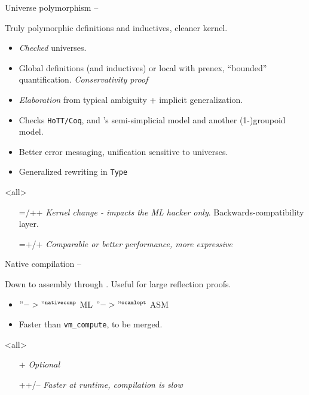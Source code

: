 
\begin{subsecframe}{Universe polymorphism -- }
  \begin{center}
    Truly polymorphic definitions and inductives, cleaner kernel. 
  \end{center}
  
  \begin{itemize}
  \item \emph{Checked} universes.
  \item Global definitions (and inductives) or local with prenex, ``bounded''
    quantification. \emph{Conservativity proof}
  \item \emph{Elaboration} from typical ambiguity + implicit
    generalization.
  \item Checks \texttt{HoTT/Coq},  and 's semi-simplicial
    model and another (1-)groupoid model.
  \item Better error messaging, unification sensitive to universes.
  \item Generalized rewriting in \alert{\texttt{Type}}
  \end{itemize}
  \mode<all>

  \begin{itemize}
  \item[=/++] \emph{Kernel change - impacts the ML hacker only}. Backwards-compatibility layer.
  \item[=+/+] \emph{Comparable or better performance, more expressive}
  \end{itemize}
\end{subsecframe}


\begin{subsecframe}{Native compilation -- }
  \begin{center}
    Down to assembly through . Useful for large reflection proofs.
  \end{center}

  \begin{itemize}
  \item \Coq $"->"^{\texttt{nativecomp}}$ \textsc{ML} $"->"^{\texttt{ocamlopt}}$ \textsc{ASM}
  \item Faster than \texttt{vm\_compute}, to be merged.
  \end{itemize}
  \mode<all>

  \begin{itemize}
  \item[+] \emph{Optional}
  \item[++/--] \emph{Faster at runtime, compilation is slow}
  \end{itemize}
\end{subsecframe}

